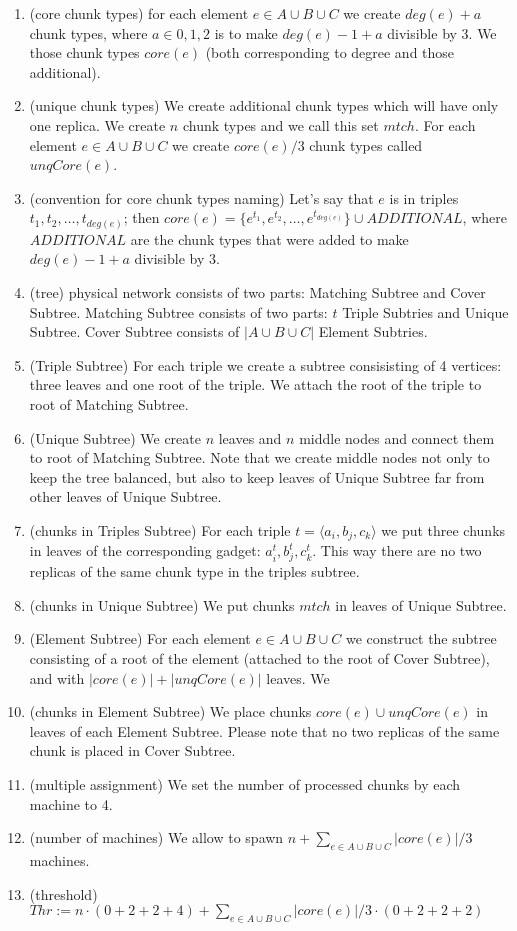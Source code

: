 \begin{enumerate}
  \item (core chunk types) for each element $e \in A\cup B\cup C$ we create
  $deg(e)+a$ chunk types, where $a\in{0,1,2}$ is to make $deg(e)-1+a$
  divisible by 3. We those chunk types $core(e)$ (both corresponding to
  degree and those additional).
  \item (unique chunk types) We create additional chunk types which
  will have only one replica. We create $n$ chunk types and we call
  this set $mtch$. For each element $e\in A\cup B\cup C$ we create $core(e)/3$
  chunk types called $unqCore(e)$.
  \item (convention for core chunk types naming) Let's say that $e$ is in triples
  $t_1,t_2,\ldots,t_{deg(e)}$; then $core(e) = \{ e^{t_1}, e^{t_2},
  \ldots, e^{t_{deg(e)}} \} \cup ADDITIONAL$, where $ADDITIONAL$ are
  the chunk types that were added to make $deg(e)-1+a$ divisible by
  3.
  \item (tree) physical network consists of two parts: Matching Subtree
  and Cover Subtree. Matching Subtree consists of two parts: $t$ Triple
  Subtries and Unique Subtree. Cover Subtree consists of $|A\cup B\cup
  C|$ Element Subtries.
  \item (Triple Subtree) For each triple we create a subtree consisisting of
  4 vertices: three leaves and one root of the triple. We attach the
  root of the triple to root of Matching Subtree.
  \item (Unique Subtree) We create $n$ leaves and $n$ middle nodes and
  connect them to root of Matching Subtree. Note that we create middle
  nodes not only to keep the tree balanced, but also to keep 
  leaves of Unique Subtree far from other leaves of Unique Subtree.
  \item (chunks in Triples Subtree) For each triple
  $t = \langle a_i, b_j, c_k \rangle$ we put three chunks in leaves of
  the corresponding gadget: $a_i^{t}, b_j^{t}, c_k^{t}$. This
  way there are no two replicas of the same chunk type in the triples
  subtree.
  \item (chunks in Unique Subtree) We put chunks $mtch$ in leaves of
  Unique Subtree.
  \item (Element Subtree) For each element $e \in A\cup B\cup C$ we construct the
  subtree consisting of a root of the element (attached to the root of
  Cover Subtree), and with $|core(e)| + |unqCore(e)|$ leaves. We
  \item (chunks in Element Subtree) We place chunks $core(e) \cup
  unqCore(e)$ in leaves of each Element Subtree.
  Please note that no two replicas of the same chunk
  is placed in Cover Subtree.
  \item (multiple assignment) We set the number of processed chunks by
  each machine to 4.
  \item (number of machines) We allow to spawn $n + \sum_{e\in A\cup
    B\cup C}|core(e)|/3$ machines.
  \item (threshold) $Thr := n\cdot (0 + 2 + 2 + 4) + \sum_{e\in A\cup
    B\cup C}|core(e)|/3 \cdot (0 + 2 + 2 + 2)$
\end{enumerate}

